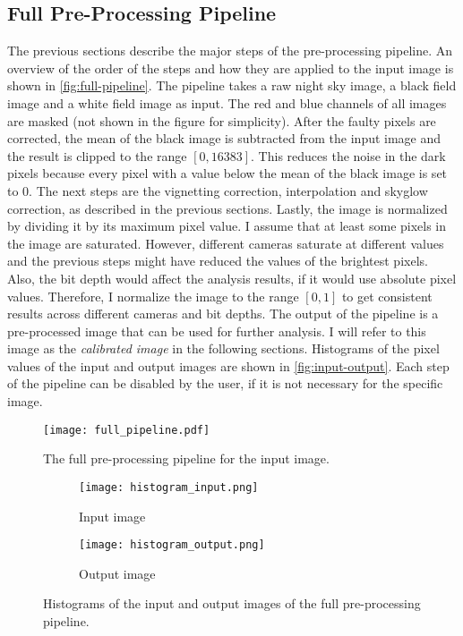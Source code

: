 \subsection{Full Pre-Processing Pipeline}
\label{sec:full-pipeline}

The previous sections describe the major steps of the pre-processing pipeline. An overview
of the order of the steps and how they are applied to the input image is shown in
\autoref{fig:full-pipeline}. The pipeline takes a raw night sky image, a black field image
and a white field image as input. The red and blue channels of all images are masked (not
shown in the figure for simplicity). After the faulty pixels are corrected, the mean of
the black image is subtracted from the input image and the result is clipped to the range
$[0, 16383]$. This reduces the noise in the dark pixels because every pixel with a value
below the mean of the black image is set to 0. The next steps are the vignetting
correction, interpolation and skyglow correction, as described in the previous sections.
Lastly, the image is normalized by dividing it by its maximum pixel value. I assume that
at least some pixels in the image are saturated. However, different cameras saturate at
different values and the previous steps might have reduced the values of the brightest
pixels. Also, the bit depth would affect the analysis results, if it would use absolute
pixel values. Therefore, I normalize the image to the range $[0, 1]$ to get consistent
results across different cameras and bit depths. The output of the pipeline is a
pre-processed image that can be used for further analysis. I will refer to this image as
the \textit{calibrated image} in the following sections. Histograms of the pixel values of
the input and output images are shown in \autoref{fig:input-output}. Each step of the
pipeline can be disabled by the user, if it is not necessary for the specific image.

\begin{figure}[tbp]
  \centering
  \texttt{[image: full\_pipeline.pdf]}
  \caption{The full pre-processing pipeline for the input image.}
  \label{fig:full-pipeline}
\end{figure}

\begin{figure}[tbp]
  \centering
  \begin{subfigure}{.49\textwidth}
    \centering
    \texttt{[image: histogram\_input.png]}
    \caption{Input image}
    \label{fig:pipeline-input}
  \end{subfigure}%
  \hfill
  \begin{subfigure}{.49\textwidth}
    \centering
    \texttt{[image: histogram\_output.png]}
    \caption{Output image}
    \label{fig:pipeline-output}
  \end{subfigure}
  \caption{Histograms of the input and output images of the full pre-processing pipeline.}
  \label{fig:input-output}
\end{figure}
